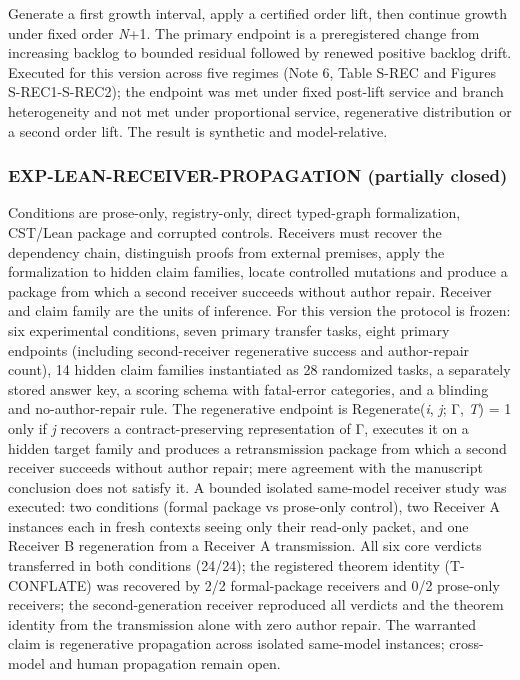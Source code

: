 Generate a first growth interval, apply a certified order lift, then
continue growth under fixed order \emph{N}+1. The primary endpoint is a
preregistered change from increasing backlog to bounded residual
followed by renewed positive backlog drift. Executed for this version
across five regimes (Note 6, Table S-REC and Figures S-REC1-S-REC2); the
endpoint was met under fixed post-lift service and branch heterogeneity
and not met under proportional service, regenerative distribution or a
second order lift. The result is synthetic and model-relative.

\hypertarget{exp-lean-receiver-propagation-partially-closed}{%
\subsubsection{EXP-LEAN-RECEIVER-PROPAGATION (partially
closed)}\label{exp-lean-receiver-propagation-partially-closed}}

Conditions are prose-only, registry-only, direct typed-graph
formalization, CST/Lean package and corrupted controls. Receivers must
recover the dependency chain, distinguish proofs from external premises,
apply the formalization to hidden claim families, locate controlled
mutations and produce a package from which a second receiver succeeds
without author repair. Receiver and claim family are the units of
inference. For this version the protocol is frozen: six experimental
conditions, seven primary transfer tasks, eight primary endpoints
(including second-receiver regenerative success and author-repair
count), 14 hidden claim families instantiated as 28 randomized tasks, a
separately stored answer key, a scoring schema with fatal-error
categories, and a blinding and no-author-repair rule. The regenerative
endpoint is Regenerate(\emph{i}, \emph{j}; Γ, \emph{T}) = 1 only if
\emph{j} recovers a contract-preserving representation of Γ, executes it
on a hidden target family and produces a retransmission package from
which a second receiver succeeds without author repair; mere agreement
with the manuscript conclusion does not satisfy it. A bounded isolated
same-model receiver study was executed: two conditions (formal package
vs prose-only control), two Receiver A instances each in fresh contexts
seeing only their read-only packet, and one Receiver B regeneration from
a Receiver A transmission. All six core verdicts transferred in both
conditions (24/24); the registered theorem identity (T-CONFLATE) was
recovered by 2/2 formal-package receivers and 0/2 prose-only receivers;
the second-generation receiver reproduced all verdicts and the theorem
identity from the transmission alone with zero author repair. The
warranted claim is regenerative propagation across isolated same-model
instances; cross-model and human propagation remain open.

